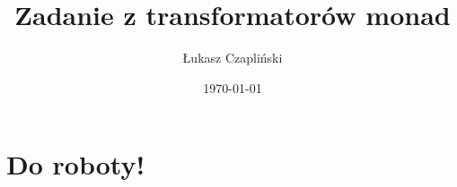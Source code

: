 \documentclass[11pt,wide]{mwart}
\title{Zadanie z transformatorów monad}
\author{Łukasz Czapliński}
\date{\today}
\begin{document}
\maketitle
\section{Do roboty!}
\end{document}
